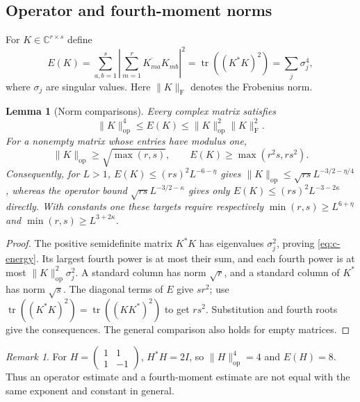 \documentclass[11pt]{article}
\newtheorem{lemma}[theorem]{Lemma}
\theoremstyle{definition}
\newcommand{\C}{\mathbb C}
\DeclareMathOperator{\tr}{tr}
\theoremstyle{remark}
\newtheorem{remark}[theorem]{Remark}
\numberwithin{equation}{section}
\newcommand{\op}{\mathrm{op}}
\newcommand{\Frob}{\mathrm{F}}
\begin{document}
\subsection{Operator and fourth-moment norms}
For $K\in\C^{r\times s}$ define
\begin{equation}\label{eq:c-energy}
 E(K)=\sum_{a,b=1}^s\left|\sum_{m=1}^r\overline{K_{ma}}K_{mb}\right|^2
 =\tr((K^*K)^2)=\sum_j\sigma_j^4,
\end{equation}
where $\sigma_j$ are singular values. Here $\|K\|_{\Frob}$ denotes the Frobenius norm.
\begin{lemma}[Norm comparisons]\label{lem:c-norms}
Every complex matrix satisfies
\begin{equation}\label{eq:c-norm-comparison}
 \|K\|_\op^4\le E(K)\le\|K\|_\op^2\|K\|_{\Frob}^2.
\end{equation}
For a nonempty matrix whose entries have modulus one,
\begin{equation}\label{eq:c-modulus-one}
 \|K\|_\op\ge\sqrt{\max(r,s)},\qquad E(K)\ge\max(r^2s,rs^2).
\end{equation}
Consequently, for $L>1$, $E(K)\le(rs)^2L^{-6-\eta}$ gives
$\|K\|_\op\le\sqrt{rs}L^{-3/2-\eta/4}$, whereas the operator bound
$\sqrt{rs}L^{-3/2-\kappa}$ gives only $E(K)\le(rs)^2L^{-3-2\kappa}$ directly.
With constants one these targets require respectively
$\min(r,s)\ge L^{6+\eta}$ and $\min(r,s)\ge L^{3+2\kappa}$.
\end{lemma}
\begin{proof}
The positive semidefinite matrix $K^*K$ has eigenvalues $\sigma_j^2$, proving \eqref{eq:c-energy}.
Its largest fourth power is at most their sum, and each fourth power is at most
$\|K\|_\op^2\sigma_j^2$. A standard column has norm $\sqrt r$, and a standard column of $K^*$ has
norm $\sqrt s$. The diagonal terms of $E$ give $sr^2$; use
$\tr((K^*K)^2)=\tr((KK^*)^2)$ to get $rs^2$. Substitution and fourth roots give the consequences.
The general comparison also holds for empty matrices.
\end{proof}
\begin{remark}\label{rem:c-hadamard}
For $H=\left(\begin{smallmatrix}1&1\\1&-1\end{smallmatrix}\right)$, $H^*H=2I$, so
$\|H\|_\op^4=4$ and $E(H)=8$. Thus an operator estimate and a fourth-moment estimate are not
equal with the same exponent and constant in general.
\end{remark}
\end{document}
